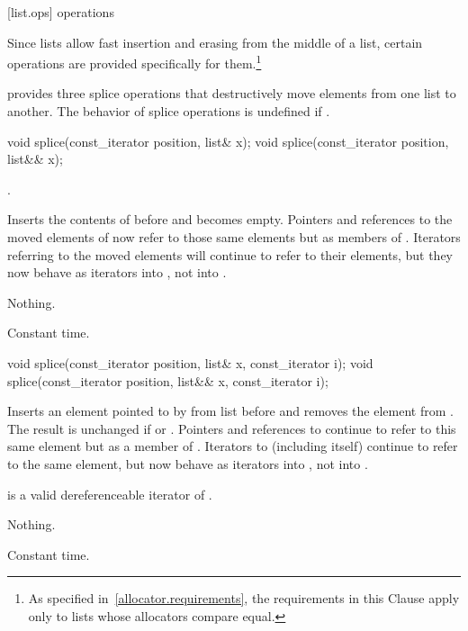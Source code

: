 [list.ops]{ operations}

\pnum
Since lists allow fast insertion and erasing from the middle of a list, certain
operations are provided specifically for them.\footnote{As specified
in~\ref{allocator.requirements}, the requirements in this Clause apply only to
lists whose allocators compare equal.}

\pnum
{} provides three splice operations that destructively move elements from one list to
another. The behavior of splice operations is undefined if .

%
\begin{itemdecl}
void splice(const_iterator position, list& x);
void splice(const_iterator position, list&& x);
\end{itemdecl}

\begin{itemdescr}
\pnum
\requires
{}.

\pnum
\effects
Inserts the contents of
before
and
becomes empty.
Pointers and references to the moved elements of
now refer to those same elements but as members of
.
Iterators referring to the moved elements will continue to refer to their
elements, but they now behave as iterators into
,
not into
.

\pnum
\throws Nothing.

\pnum
\complexity
Constant time.
\end{itemdescr}

%
%
\begin{itemdecl}
void splice(const_iterator position, list& x, const_iterator i);
void splice(const_iterator position, list&& x, const_iterator i);
\end{itemdecl}

\begin{itemdescr}
\pnum
\effects
Inserts an element pointed to by
from list
before  and removes the element from
.
The result is unchanged if
or
.
Pointers and references to
continue to refer to this same element but as a member of
.
Iterators
to
(including
itself) continue to refer to the same element, but now behave as iterators into
,
not into
.

\pnum
\requires
{}
is a valid dereferenceable iterator of
.

\pnum
\throws Nothing.

\pnum
\complexity
Constant time.
\end{itemdescr}

